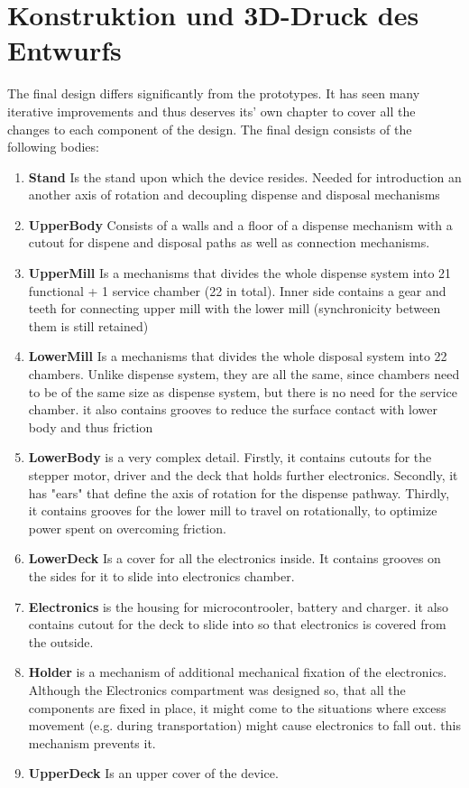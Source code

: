 \section{Konstruktion und 3D-Druck des Entwurfs}
The final design differs significantly from the prototypes. It has seen many iterative improvements and thus deserves its' own chapter to cover all the changes to each component of the design. The final design consists of the following bodies:
\begin{enumerate}
	\item{\textbf{Stand}} Is the stand upon which the device resides. Needed for introduction an another axis of rotation and decoupling dispense and disposal mechanisms
	\item{\textbf{UpperBody}} Consists of a walls and a floor of a dispense mechanism with a cutout for dispene and disposal paths as well as connection mechanisms.
	\item{\textbf{UpperMill}} Is a mechanisms that divides the whole dispense system into 21 functional + 1 service chamber (22 in total). Inner side contains a gear and teeth for connecting upper mill with the lower mill (synchronicity between them is still retained)
	\item{\textbf{LowerMill}} Is a mechanisms that divides the whole disposal system into 22 chambers. Unlike dispense system, they are all the same, since chambers need to be of the same size as dispense system, but there is no need for the service chamber. it also contains grooves to reduce the surface contact with lower body and thus friction
	\item{\textbf{LowerBody}} is a very complex detail. Firstly, it contains cutouts for the stepper motor, driver and the deck that holds further electronics. Secondly, it has "ears" that define the axis of rotation for the dispense pathway. Thirdly, it contains grooves for the lower mill to travel on rotationally, to optimize power spent on overcoming friction.
	\item{\textbf{LowerDeck}} Is a cover for all the electronics inside. It contains grooves on the sides for it to slide into electronics chamber.
	\item{\textbf{Electronics}} is the housing for microcontrooler, battery and charger. it also contains cutout for the deck to slide into so that electronics is covered from the outside.
	\item{\textbf{Holder}} is a mechanism of additional mechanical fixation of the electronics. Although the Electronics compartment was designed so, that all the components are fixed in place, it might come to the situations where excess movement (e.g. during transportation) might cause electronics to fall out. this mechanism prevents it.
	\item{\textbf{UpperDeck}} Is an upper cover of the device.
\end{enumerate}

